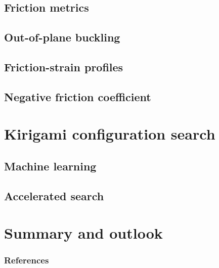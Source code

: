 \documentclass[UKenglish]{beamer}
\begin{document}
\subsection{Friction metrics}
\subsection{Out-of-plane buckling}
\subsection{Friction-strain profiles}
\subsection{Negative friction coefficient}


\section{Kirigami configuration search} %
\subsection{Machine learning}
\subsection{Accelerated search}



\section{Summary and outlook} %



\begin{frame}%
	\frametitle{References}
	
	
\end{frame}
\end{document}
